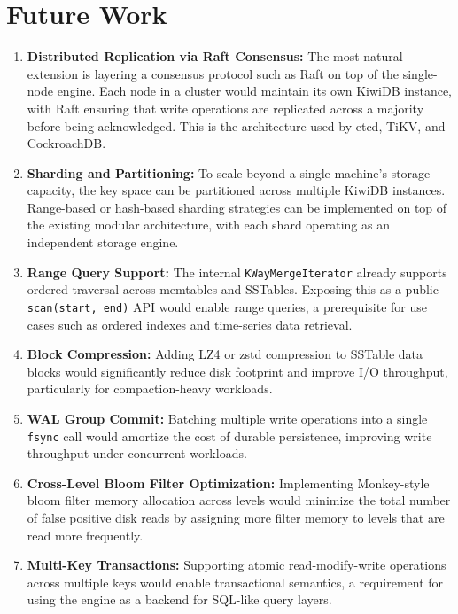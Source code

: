 \documentclass[oneside,a4paper,12pt]{book}
\begin{document}
\section{Future Work}

\begin{enumerate}[leftmargin=2em]
    \item \textbf{Distributed Replication via Raft Consensus:} The most natural extension is layering a consensus protocol such as Raft on top of the single-node engine. Each node in a cluster would maintain its own KiwiDB instance, with Raft ensuring that write operations are replicated across a majority before being acknowledged. This is the architecture used by etcd, TiKV, and CockroachDB.

    \item \textbf{Sharding and Partitioning:} To scale beyond a single machine's storage capacity, the key space can be partitioned across multiple KiwiDB instances. Range-based or hash-based sharding strategies can be implemented on top of the existing modular architecture, with each shard operating as an independent storage engine.

    \item \textbf{Range Query Support:} The internal \texttt{KWayMergeIterator} already supports ordered traversal across memtables and SSTables. Exposing this as a public \texttt{scan(start, end)} API would enable range queries, a prerequisite for use cases such as ordered indexes and time-series data retrieval.

    \item \textbf{Block Compression:} Adding LZ4 or zstd compression to SSTable data blocks would significantly reduce disk footprint and improve I/O throughput, particularly for compaction-heavy workloads.

    \item \textbf{WAL Group Commit:} Batching multiple write operations into a single \texttt{fsync} call would amortize the cost of durable persistence, improving write throughput under concurrent workloads.

    \item \textbf{Cross-Level Bloom Filter Optimization:} Implementing Monkey-style bloom filter memory allocation across levels would minimize the total number of false positive disk reads by assigning more filter memory to levels that are read more frequently.

    \item \textbf{Multi-Key Transactions:} Supporting atomic read-modify-write operations across multiple keys would enable transactional semantics, a requirement for using the engine as a backend for SQL-like query layers.
\end{enumerate}
\end{document}
